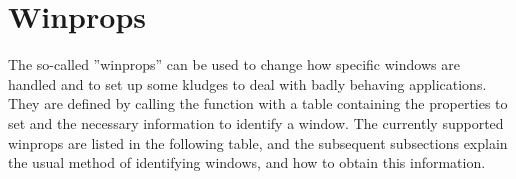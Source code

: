 \section{Winprops}
\label{sec:winprops}

The so-called ''winprops'' can be used to change how
specific windows are handled and to set up some kludges to deal with
badly behaving applications. They are defined by calling the function
 with a table containing the properties to set and the
necessary information to identify a window. The currently supported
winprops are listed in the following table, and the subsequent
subsections explain the usual method of identifying windows, and how
to obtain this information.



